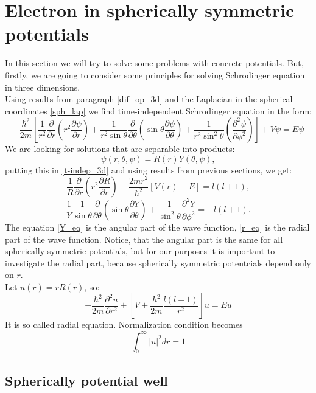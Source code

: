 \documentclass[a4paper, 12pt]{article}
\begin{document}
\section{Electron in spherically symmetric potentials}\label{e_sph_poten}
In this section we will try to solve some problems with concrete potentials. But, firstly, we are going to consider some principles for solving  Schrodinger equation in three dimensions.\\
Using results from paragraph \ref{dif_op_3d} and the Laplacian in the spherical coordinates \eqref{sph_lap}  we find time-independent Schrodinger equation in the form:
\begin{equation}\label{t-indep_3d}
-\frac{\hbar^2}{2m}[\frac{1}{r^2} \frac{\partial}{\partial r}({r^2}\frac{\partial \psi}{\partial r})+\frac{1}{r^2\sin{\theta}}\frac{\partial}{\partial \theta}(\sin{\theta}\frac{\partial \psi}{\partial \theta})+\frac{1}{r^2\sin^2{\theta}}(\frac{\partial^2 \psi}{\partial \phi^2}) ] + V\psi = E \psi
\end{equation}
We are looking for solutions that are separable into products:
$$\psi (r, \theta, \psi) = R(r)Y(\theta, \psi),$$
putting this in \eqref{t-indep_3d} and using results from previous sections, we get:
\begin{equation}\label{r_eq}
	\frac{1}{R}\frac{\partial}{\partial r}(r^2 \frac{\partial R}{\partial r}) - \frac{2m r^2}{\hbar^2}[V(r)-E] = l(l+1),
\end{equation}
\begin{equation}\label{Y_eq}
	\frac{1}{Y}\frac{1}{\sin \theta}\frac{\partial}{\partial \theta}(\sin \theta \frac{\partial Y}{\partial \theta}) + \frac{1}{\sin^2 \theta}\frac{\partial^2 Y}{\partial \phi^2}=-l(l+1).
\end{equation}
The equation \eqref{Y_eq} is the angular part of the wave function, \eqref{r_eq} is the radial part of the wave function. Notice, that  the angular part is the same for all spherically symmetric potentials, but for our purposes it is important to investigate the radial part, because spherically symmetric potentcials depend only on $r.$\\
Let $u(r) = r R(r)$, so:
\begin{equation}\label{r_eq}
	-\frac{\hbar^2}{2m}\frac{\partial^2 u}{\partial r^2}+[V+\frac{\hbar^2}{2m}\frac{l(l+1)}{r^2}]u = Eu
\end{equation}
It is so called radial equation. Normalization condition becomes
$$\int_{0}^{\infty} |u|^2  dr=1$$

\subsection{Spherically potential well}
\end{document}
